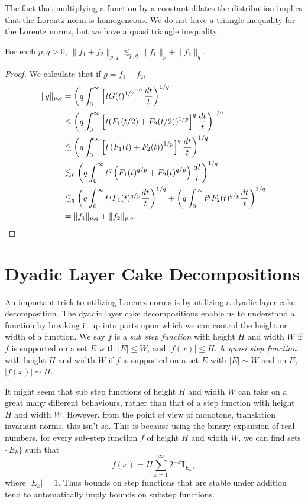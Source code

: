 The fact that multiplying a function by a constant dilates the distribution implies that the Lorentz norm is homogeneous. We do not have a triangle inequality for the Lorentz norms, but we have a quasi triangle inequality.

\begin{theorem}
	For each $p,q > 0$, $\| f_1 + f_2 \|_{p,q} \lesssim_{p,q} \| f_1 \|_p + \| f_2 \|_q$.
\end{theorem}
\begin{proof}
    We calculate that if $g = f_1 + f_2$,
    \begin{align*}
    \| g \|_{p,q} &= \left( q \int_0^\infty \left[t G(t)^{1/p} \right]^q \frac{dt}{t} \right)^{1/q}\\
    &\leq \left( q \int_0^\infty \left[ t (F_1(t/2) + F_2(t/2))^{1/p} \right]^q \frac{dt}{t} \right)^{1/q}\\
    &\lesssim \left( q \int_0^\infty \left[ t \left( F_1(t) + F_2(t) \right)^{1/p} \right]^q \frac{dt}{t} \right)^{1/q}\\
    &\lesssim_p \left( q \int_0^\infty t^q \left( F_1(t)^{q/p} + F_2(t)^{q/p} \right) \frac{dt}{t} \right)^{1/q}\\
    &\lesssim_q  \left( q \int_0^\infty t^q F_1(t)^{q/p} \frac{dt}{t} \right)^{1/q} +  \left( q \int_0^\infty t^q F_2(t)^{q/p} \frac{dt}{t} \right)^{1/q}\\
    &= \| f_1 \|_{p,q} + \| f_2 \|_{p,q}. \qedhere
  \end{align*}
\end{proof}

\section{Dyadic Layer Cake Decompositions}

An important trick to utilizing Lorentz norms is by utilizing a dyadic layer cake decomposition. The dyadic layer cake decompositions enable us to understand a function by breaking it up into parts upon which we can control the height or width of a function. We say $f$ is a \emph{sub step function} with height $H$ and width $W$ if $f$ is supported on a set $E$ with $|E| \leq W$, and $|f(x)| \leq H$. A \emph{quasi step function} with height $H$ and width $W$ if $f$ is supported on a set $E$ with $|E| \sim W$ and on $E$, $|f(x)| \sim H$.

\begin{remark}
  It might seem that sub step functions of height $H$ and width $W$ can take on a great many different behaviours, rather than that of a step function with height $H$ and width $W$. However, from the point of view of monotone, translation invariant norms, this isn't so. This is because using the binary expansion of real numbers, for every sub-step function $f$ of height $H$ and width $W$, we can find sets $\{ E_k \}$ such that
  \[ f(x) = H \sum_{k = 1}^\infty 2^{-k} \mathbf{I}_{E_k}, \]
  where $|E_k| = 1$. Thus bounds on step functions that are stable under addition tend to automatically imply bounds on substep functions.
\end{remark}

